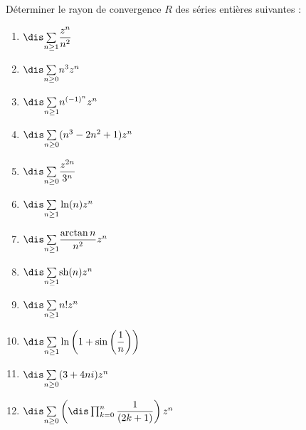 \documentclass[a4paper,10pt]{report}
\newcommand{\Sum}[2]{\ensuremath{\textstyle{\sum\limits_{#1}^{#2}}}}
\begin{document}
\begin{Exercice}{} Déterminer le rayon de convergence $R$ des séries entières suivantes :

\begin{multicols}{3}
\begin{enumerate}
\item $\dis \Sum{n \geq 1}{} \dfrac{z^n}{n^2}$
\item $\dis \Sum{n \geq 0}{} n^3 z^n$
\item $\dis \Sum{n \geq 1}{} n^{(-1)^n}z^n$
\item $\dis \Sum{n \geq 0}{} (n^3-2n^2+1)z^n$
\columnbreak
\item $\dis \Sum{n \geq 0}{} \dfrac{z^{2n}}{3^n}$
\item $\dis \Sum{n \geq 1}{} \ln(n) z^n$
\item $\dis \Sum{n \geq 1}{} \dfrac{\arctan n}{n^2}z^n$
\item $\dis \Sum{n \geq 1}{} \textrm{sh}(n) z^n$
\columnbreak
\item $\dis \Sum{n \geq 1}{} n! z^n$
\item $\dis \Sum{n \geq 1}{}\ln\left(1+\sin \left(\dfrac{1}{n}\right) \right)$
\item $\dis \Sum{n \geq 0}{} (3+4ni) z^n$
\item $\dis \Sum{n \geq 0}{}   \left(\dis \prod_{k=0}^n\dfrac{1}{(2k+1)}\right) z^n$
\end{enumerate}
\end{multicols}

\medskip

\end{Exercice}


\corr
\end{document}
